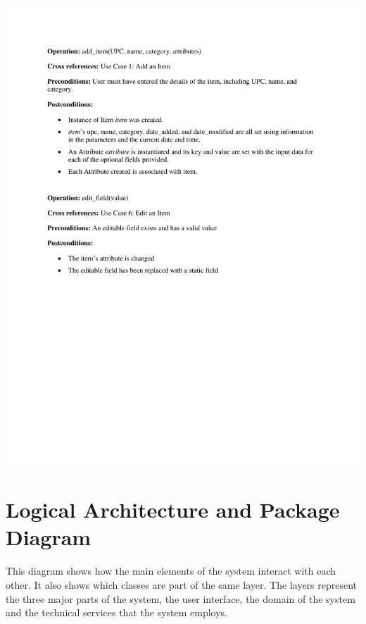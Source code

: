 \documentclass{article}
\begin{document}
\includegraphics[keepaspectratio, width=6in]{Operational_Contracts.pdf}\\

\section{Logical Architecture and Package Diagram}
This diagram shows how the main elements of the system interact with each other.  It also shows which classes are part of the same layer.  The layers represent the three major parts of the system, the user interface, the domain of the system and the technical services that the system employs. 
\end{document}
